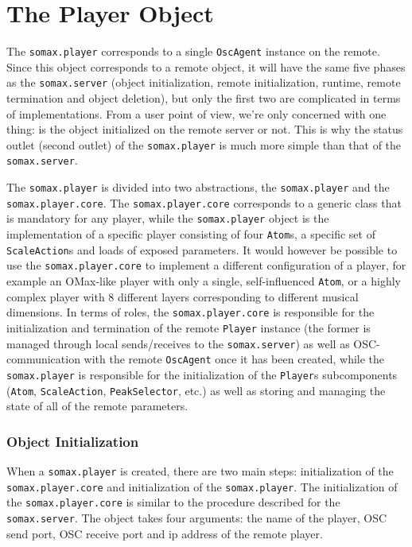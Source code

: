 
\section{The Player Object}\label{ssec:3-player}

The \texttt{somax.player} corresponds to a single \texttt{OscAgent} instance on the remote. Since this object corresponds to a remote object, it will have the same five phases as the \texttt{somax.server} (object initialization, remote initialization, runtime, remote termination and object deletion), but only the first two are complicated in terms of implementations. From a user point of view, we're only concerned with one thing: is the object initialized on the remote server or not. This is why the status outlet (second outlet) of the \texttt{somax.player} is much more simple than that of the \texttt{somax.server}.

The \texttt{somax.player} is divided into two abstractions, the \texttt{somax.player} and the \texttt{somax.player.core}. The \texttt{somax.player.core} corresponds to a generic class that is mandatory for any player, while the \texttt{somax.player} object is the implementation of a specific player consisting of four \texttt{Atom}s, a specific set of \texttt{ScaleAction}s and loads of exposed parameters. It would however be possible to use the \texttt{somax.player.core} to implement a different configuration of a player, for example an OMax-like player with only a single, self-influenced \texttt{Atom}, or a highly complex player with 8 different layers corresponding to different musical dimensions. In terms of roles, the \texttt{somax.player.core} is responsible for the initialization and termination of the remote \texttt{Player} instance (the former is managed through local sends/receives to the \texttt{somax.server}) as well as OSC-communication with the remote \texttt{OscAgent} once it has been created, while the \texttt{somax.player} is responsible for the initialization of the \texttt{Player}s subcomponents (\texttt{Atom}, \texttt{ScaleAction}, \texttt{PeakSelector}, etc.) as well as storing and managing the state of all of the remote parameters.


\subsubsection{Object Initialization}
When a \texttt{somax.player} is created, there are two main steps: initialization of the \texttt{somax.player.core} and initialization of the \texttt{somax.player}. The initialization of the \texttt{somax.player.core} is similar to the procedure described for the \texttt{somax.server}. The object takes four arguments: the name of the player, OSC send port, OSC receive port and ip address of the remote player. 

